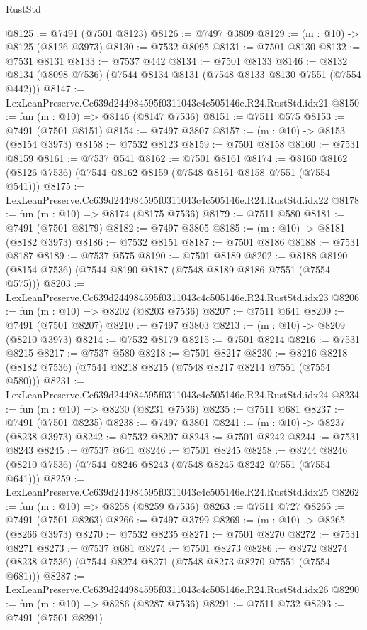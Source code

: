 \begin{lexlean}{RustStd}
\begin{coremodule}
@8125 := @7491 (@7501 @8123)
@8126 := @7497 @3809
@8129 := (m : @10) -> @8125 (@8126 @3973)
@8130 := @7532 @8095
@8131 := @7501 @8130
@8132 := @7531 @8131
@8133 := @7537 @442
@8134 := @7501 @8133
@8146 := @8132 @8134 (@8098 @7536) (@7544 @8134 @8131 (@7548 @8133 @8130 @7551 (@7554 @442)))
@8147 := LexLeanPreserve.Cc639d244984595f0311043c4c505146e.R24.RustStd.idx21
@8150 := fun (m : @10) => @8146 (@8147 @7536)
@8151 := @7511 @575
@8153 := @7491 (@7501 @8151)
@8154 := @7497 @3807
@8157 := (m : @10) -> @8153 (@8154 @3973)
@8158 := @7532 @8123
@8159 := @7501 @8158
@8160 := @7531 @8159
@8161 := @7537 @541
@8162 := @7501 @8161
@8174 := @8160 @8162 (@8126 @7536) (@7544 @8162 @8159 (@7548 @8161 @8158 @7551 (@7554 @541)))
@8175 := LexLeanPreserve.Cc639d244984595f0311043c4c505146e.R24.RustStd.idx22
@8178 := fun (m : @10) => @8174 (@8175 @7536)
@8179 := @7511 @580
@8181 := @7491 (@7501 @8179)
@8182 := @7497 @3805
@8185 := (m : @10) -> @8181 (@8182 @3973)
@8186 := @7532 @8151
@8187 := @7501 @8186
@8188 := @7531 @8187
@8189 := @7537 @575
@8190 := @7501 @8189
@8202 := @8188 @8190 (@8154 @7536) (@7544 @8190 @8187 (@7548 @8189 @8186 @7551 (@7554 @575)))
@8203 := LexLeanPreserve.Cc639d244984595f0311043c4c505146e.R24.RustStd.idx23
@8206 := fun (m : @10) => @8202 (@8203 @7536)
@8207 := @7511 @641
@8209 := @7491 (@7501 @8207)
@8210 := @7497 @3803
@8213 := (m : @10) -> @8209 (@8210 @3973)
@8214 := @7532 @8179
@8215 := @7501 @8214
@8216 := @7531 @8215
@8217 := @7537 @580
@8218 := @7501 @8217
@8230 := @8216 @8218 (@8182 @7536) (@7544 @8218 @8215 (@7548 @8217 @8214 @7551 (@7554 @580)))
@8231 := LexLeanPreserve.Cc639d244984595f0311043c4c505146e.R24.RustStd.idx24
@8234 := fun (m : @10) => @8230 (@8231 @7536)
@8235 := @7511 @681
@8237 := @7491 (@7501 @8235)
@8238 := @7497 @3801
@8241 := (m : @10) -> @8237 (@8238 @3973)
@8242 := @7532 @8207
@8243 := @7501 @8242
@8244 := @7531 @8243
@8245 := @7537 @641
@8246 := @7501 @8245
@8258 := @8244 @8246 (@8210 @7536) (@7544 @8246 @8243 (@7548 @8245 @8242 @7551 (@7554 @641)))
@8259 := LexLeanPreserve.Cc639d244984595f0311043c4c505146e.R24.RustStd.idx25
@8262 := fun (m : @10) => @8258 (@8259 @7536)
@8263 := @7511 @727
@8265 := @7491 (@7501 @8263)
@8266 := @7497 @3799
@8269 := (m : @10) -> @8265 (@8266 @3973)
@8270 := @7532 @8235
@8271 := @7501 @8270
@8272 := @7531 @8271
@8273 := @7537 @681
@8274 := @7501 @8273
@8286 := @8272 @8274 (@8238 @7536) (@7544 @8274 @8271 (@7548 @8273 @8270 @7551 (@7554 @681)))
@8287 := LexLeanPreserve.Cc639d244984595f0311043c4c505146e.R24.RustStd.idx26
@8290 := fun (m : @10) => @8286 (@8287 @7536)
@8291 := @7511 @732
@8293 := @7491 (@7501 @8291)

\end{coremodule}
\end{lexlean}
